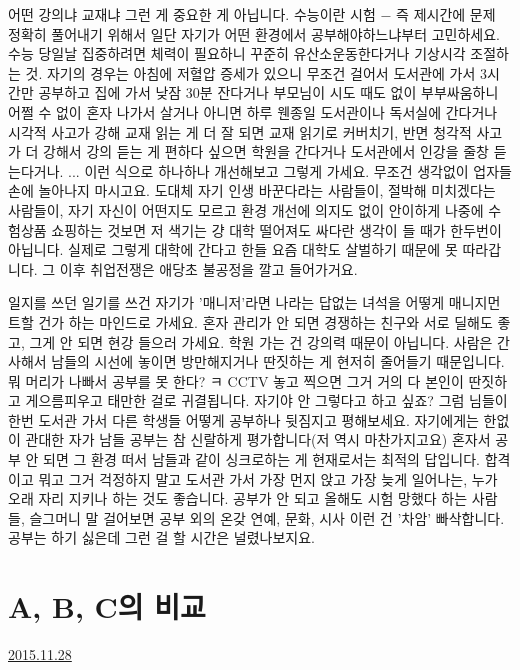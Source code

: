 어떤 강의냐 교재냐 그런 게 중요한 게 아닙니다.
수능이란 시험 $-$ 즉 제시간에 문제 정확히 풀어내기 위해서 일단 자기가 어떤 환경에서 공부해야하느냐부터 고민하세요.
수능 당일날 집중하려면 체력이 필요하니 꾸준히 유산소운동한다거나  기상시각 조절하는 것.
자기의 경우는 아침에 저혈압 증세가 있으니 무조건 걸어서 도서관에 가서 3시간만 공부하고 집에 가서 낮잠 30분 잔다거나
부모님이 시도 때도 없이 부부싸움하니 어쩔 수 없이 혼자 나가서 살거나 아니면 하루 웬종일 도서관이나 독서실에 간다거나
시각적 사고가 강해 교재 읽는 게 더 잘 되면 교재 읽기로 커버치기,
반면 청각적 사고가 더 강해서 강의 듣는 게 편하다 싶으면 학원을 간다거나 도서관에서 인강을 줄창 듣는다거나.
... 이런 식으로 하나하나 개선해보고 그렇게 가세요. 무조건 생각없이 업자들 손에 놀아나지 마시고요.
도대체 자기 인생 바꾼다라는 사람들이, 절박해 미치겠다는 사람들이, 자기 자신이 어떤지도 모르고 환경 개선에 의지도 없이
안이하게 나중에 수험상품 쇼핑하는 것보면 저 색기는 걍 대학 떨어져도 싸다란 생각이 들 때가 한두번이 아닙니다.
실제로 그렇게 대학에 간다고 한들 요즘 대학도 살벌하기 때문에 못 따라갑니다. 그 이후 취업전쟁은 애당초 불공정을 깔고 들어가거요.
\vspace{5mm}

일지를 쓰던 일기를 쓰건 자기가 '매니저'라면 나라는 답없는 녀석을 어떻게 매니지먼트할 건가 하는 마인드로 가세요.
혼자 관리가 안 되면 경쟁하는 친구와 서로 딜해도 좋고, 그게 안 되면 현강 들으러 가세요.
학원 가는 건 강의력 때문이 아닙니다. 사람은 간사해서 남들의 시선에 놓이면 방만해지거나 딴짓하는 게 현저히 줄어들기 때문입니다.
뭐 머리가 나빠서 공부를 못 한다? ㅋ
CCTV 놓고 찍으면 그거 거의 다 본인이 딴짓하고 게으름피우고 태만한 걸로 귀결됩니다.
자기야 안 그렇다고 하고 싶죠? 그럼 님들이 한번 도서관 가서 다른 학생들 어떻게 공부하나 뒷짐지고 평해보세요.
자기에게는 한없이 관대한 자가 남들 공부는 참 신랄하게 평가합니다(저 역시 마찬가지고요)
혼자서 공부 안 되면 그 환경 떠서 남들과 같이 싱크로하는 게 현재로서는 최적의 답입니다.
합격이고 뭐고 그거 걱정하지 말고 도서관 가서 가장 먼지 앉고 가장 늦게 일어나는, 누가 오래 자리 지키나 하는 것도 좋습니다.
공부가 안 되고 올해도 시험 망했다 하는 사람들,
슬그머니 말 걸어보면 공부 외의 온갖 연예, 문화, 시사 이런 건 '차암' 빠삭합니다.
공부는 하기 싫은데 그런 걸 할 시간은 널렸나보지요.
\vspace{5mm}






\section{A, B, C의 비교}
\href{https://www.kockoc.com/Apoc/515764}{2015.11.28}

